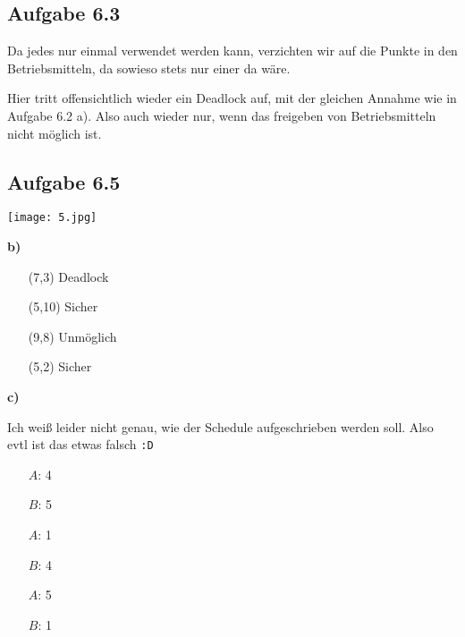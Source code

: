 \documentclass[a4paper,graphics,11pt]{article}
\newcommand{\aufgabe}[1]{\subsection*{Aufgabe #1}}
\begin{document}
\aufgabe{6.3}

Da jedes nur einmal verwendet werden kann, verzichten wir auf die Punkte in den Betriebsmitteln, da sowieso stets nur einer da wäre.


Hier tritt offensichtlich wieder ein Deadlock auf, mit der gleichen Annahme wie in Aufgabe 6.2 a). Also auch wieder nur, wenn das freigeben von Betriebsmitteln nicht möglich ist.

\aufgabe{6.5}

\texttt{[image: 5.jpg]}

\textbf{b)}

\begin{itemize}
    \item[(7,3)] Deadlock
    \item[(5,10)] Sicher
    \item[(9,8)] Unmöglich
    \item[(5,2)] Sicher
\end{itemize}

\textbf{c)}

Ich weiß leider nicht genau, wie der Schedule aufgeschrieben werden soll. Also evtl ist das etwas falsch \texttt{:D}
\begin{itemize}
    \item[$A$:] 4
    \item[$B$:] 5
    \item[$A$:] 1
    \item[$B$:] 4
    \item[$A$:] 5
    \item[$B$:] 1
\end{itemize}
\end{document}
